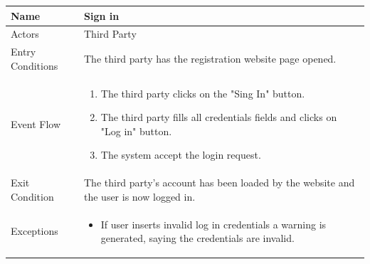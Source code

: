 \begin{enumerate}
\FloatBarrier
\begin{table}[h]
\begin{tabular}{|l|p{}|}
\hline
Name             & Sign in \\ \hline
Actors           & Third Party  \\ \hline
Entry Conditions & The third party has the registration website page opened.    \\ \hline
Event Flow       & \begin{enumerate}
            \item The third party clicks on the "Sing In" button.
            \item The third party fills all credentials fields and clicks on "Log in" button.
            \item The system accept the login request.
        \end{enumerate}\\ \hline
Exit Condition   & The third party's account has been loaded by the website and the user is now logged in.\\ \hline
Exceptions       & \begin{itemize}
\item If user inserts invalid log in credentials a warning is generated, saying the credentials are invalid.
\end{itemize}\\ \hline
\end{tabular}
\end{table}
\FloatBarrier


\end{enumerate}
